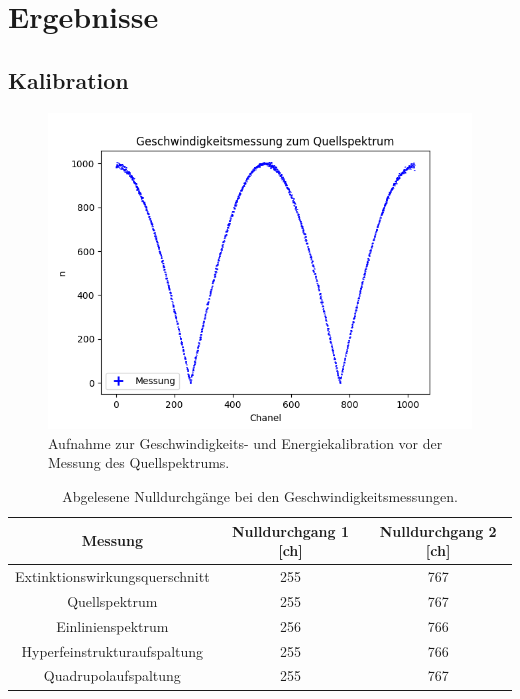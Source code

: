 \documentclass[12pt,a4paper]{article}
\begin{document}
\section{Ergebnisse}
\subsection{Kalibration}

\begin{figure}
\centering
\includegraphics[scale=0.8]{Bilder/Kalibration/Quellspektrum_rohdaten.png}
\caption{Aufnahme zur Geschwindigkeits- und Energiekalibration vor der Messung des Quellspektrums.}
\label{fig:KalibrationRohdaten_Beispiel}
\end{figure}

\begin{table}
\centering
\begin{tabular}{|c|c|c|}
\hline 
Messung & Nulldurchgang 1 [ch] & Nulldurchgang 2 [ch] \\ 
\hline 
Extinktionswirkungsquerschnitt & 255 & 767 \\
\hline 
Quellspektrum & 255 & 767 \\
\hline 
Einlinienspektrum & 256 & 766 \\
\hline 
Hyperfeinstrukturaufspaltung & 255 & 766 \\
\hline 
Quadrupolaufspaltung & 255 & 767 \\
\hline 
\end{tabular} 
\caption{Abgelesene Nulldurchgänge bei den Geschwindigkeitsmessungen.}
\label{tab:Kalibration_Nulldurchgänge}
\end{table}
\end{document}
